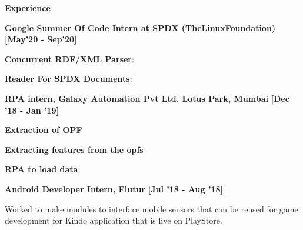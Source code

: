 \colorbox{titleColor}{\parbox{6.7in}{\textbf{Experience}}}

\begin{itemize*}
  \setlength{\itemsep}{.00pt}
  \item \textbf{{Google Summer Of Code Intern at SPDX (TheLinuxFoundation)}} 
  \hfill {\small{{\textbf{[May'20 - Sep'20]}}\/}}
      \begin{itemize*}
       \item \textbf{Concurrent RDF/XML Parser}:
      \item \textbf{Reader For SPDX Documents}:
      \end{itemize*}   
\end{itemize*}

\begin{itemize*}
  \setlength{\itemsep}{.00pt}
  \item \textbf{{RPA intern, Galaxy Automation Pvt Ltd. Lotus Park, Mumbai}} \hfill {\small{{\textbf{[Dec '18 - Jan '19]}}\/}}
      \begin{itemize*}
       \item \textbf{Extraction of OPF}
      \item \textbf{Extracting features from the opfs}
      \item \textbf{RPA to load data}
      \end{itemize*}   
\end{itemize*}

\begin{itemize*}
  \setlength{\itemsep}{.00pt}
  \item \textbf{{Android Developer Intern, Flutur}} \hfill {\small{{\textbf{[Jul '18 - Aug '18]}}\/}}
      \begin{itemize*}
       \item Worked to make modules to interface mobile sensors that can be reused for game development for Kindo application that is live on PlayStore.
      \end{itemize*}   
\end{itemize*}

